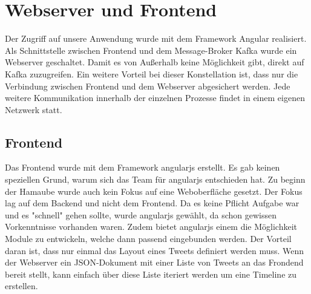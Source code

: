 \chapter{Webserver und Frontend}
Der Zugriff auf unsere Anwendung wurde mit dem Framework Angular realisiert. Als Schnittstelle zwischen Frontend und dem Message-Broker Kafka wurde ein Webserver geschaltet. Damit es von Außerhalb keine Möglichkeit gibt, direkt auf Kafka zuzugreifen. Ein weitere Vorteil bei dieser Konstellation ist, dass nur die Verbindung zwischen Frontend und dem Webserver abgesichert werden. Jede weitere Kommunikation innerhalb der einzelnen Prozesse findet in einem eigenen Netzwerk statt.

\section{Frontend}
Das Frontend wurde mit dem Framework angularjs erstellt. Es gab keinen speziellen Grund, warum sich das Team für angularjs entschieden hat. Zu beginn der Hamaube wurde auch kein Fokus auf eine Weboberfläche gesetzt. Der Fokus lag auf dem Backend und nicht dem Frontend. Da es keine Pflicht Aufgabe war und es "schnell" gehen sollte, wurde angularjs gewählt, da schon gewissen Vorkenntnisse vorhanden waren. Zudem bietet angularjs einem die Möglichkeit Module zu entwickeln, welche dann passend eingebunden werden. Der Vorteil daran ist, dass nur einmal das Layout eines Tweets definiert werden muss. Wenn der Webserver ein JSON-Dokument mit einer Liste von Tweets an das Frondend bereit stellt, kann einfach über diese Liste iteriert werden um eine Timeline zu erstellen. \\



	
	
	
